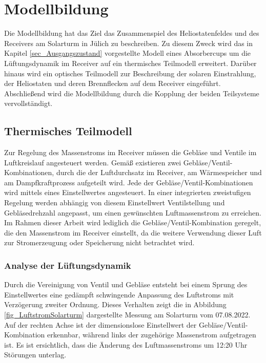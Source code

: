 \chapter{Modellbildung} \label{ch_Modellbildung}
Die Modellbildung hat das Ziel das Zusammenspiel des Heliostatenfeldes und des Receivers am Solarturm in Jülich zu beschreiben.
Zu diesem Zweck wird das in Kapitel \ref{sec_Ausgangszustand} vorgestellte Modell eines Absorbercups um die Lüftungsdynamik im Receiver auf ein thermisches Teilmodell erweitert.
Darüber hinaus wird ein optisches Teilmodell zur Beschreibung der solaren Einstrahlung, der Heliostaten und deren Brennflecken auf dem Receiver eingeführt.
Abschließend wird die Modellbildung durch die Kopplung der beiden Teilsysteme vervollständigt.

\section{Thermisches Teilmodell} \label{sec_thermischesModell}
Zur Regelung des Massenstroms im Receiver müssen die Gebläse und Ventile im Luftkreislauf angesteuert werden.
Gemäß \cite[S.10ff]{DissGall} existieren zwei Gebläse/Ventil-Kombinationen, durch die der Luftdurchsatz im Receiver, am Wärmespeicher und am Dampfkraftprozess aufgeteilt wird.
Jede der Gebläse/Ventil-Kombinationen wird mittels eines Einstellwertes angesteuert.
In einer integrierten zweistufigen Regelung werden abhängig von diesem Einstellwert Ventilstellung und Gebläsedrehzahl angepasst, um einen gewünschten Luftmassenstrom zu erreichen.
Im Rahmen dieser Arbeit wird lediglich die Gebläse/Ventil-Kombination geregelt, die den Massenstrom im Receiver einstellt, da die weitere Verwendung dieser Luft zur Stromerzeugung oder Speicherung nicht betrachtet wird.

\subsection{Analyse der Lüftungsdynamik}
Durch die Vereinigung von Ventil und Gebläse entsteht bei einem Sprung des Einstellwertes eine gedämpft schwingende Anpassung des Luftstroms mit Verzögerung zweiter Ordnung.
Dieses Verhalten zeigt die in Abbildung \ref{fig_LuftstromSolarturm} dargestellte Messung am Solarturm vom 07.08.2022.
Auf der rechten Achse ist der dimensionslose Einstellwert der Gebläse/Ventil-Kombination erkennbar, während links der zugehörige Massenstrom aufgetragen ist.
Es ist ersichtlich, dass die Änderung des Luftmassenstroms um 12:20 Uhr Störungen unterlag. \newpage

